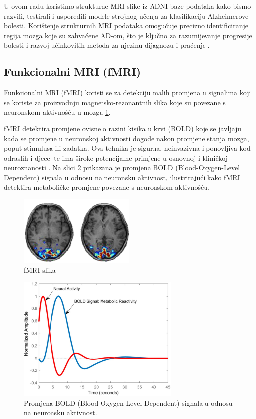 \documentclass[zavrsnirad]{fer}
\begin{document}
 U ovom radu koristimo strukturne MRI slike iz ADNI baze podataka kako bismo razvili, testirali i usporedili modele strojnog učenja za klasifikaciju Alzheimerove bolesti. Korištenje strukturnih MRI podataka omogućuje precizno identificiranje regija mozga koje su zahvaćene AD-om, što je ključno za razumijevanje progresije bolesti i razvoj učinkovitih metoda za njezinu dijagnozu i praćenje \cite{Gonuguntla2022}.


\subsection{Funkcionalni MRI (fMRI)}

Funkcionalni MRI (fMRI) koristi se za detekciju malih promjena u signalima koji se koriste za proizvodnju magnetsko-rezonantnih slika koje su povezane s neuronskom aktivnošću u mozgu \ref{fig:fMRI}. 

fMRI detektira promjene ovisne o razini kisika u krvi (BOLD) koje se javljaju kada se promjene u neuronskoj aktivnosti dogode nakon promjene stanja mozga, poput stimulusa ili zadatka. Ova tehnika je sigurna, neinvazivna i ponovljiva kod odraslih i djece, te ima široke potencijalne primjene u osnovnoj i kliničkoj neuroznanosti \cite{Gore2003}. Na slici \ref{fig:fMRI_BOLD} prikazana je promjena BOLD (Blood-Oxygen-Level Dependent) signala u odnosu na neuronsku aktivnost, ilustrirajući kako fMRI detektira metaboličke promjene povezane s neuronskom aktivnošću.


\begin{figure}[h]
	\centering
	\includegraphics[width=0.5\textwidth]{Figures/fMRI.png}
	\caption{fMRI slika \cite{ucsd2021}}
	\label{fig:fMRI}
\end{figure}

\begin{figure}[h]
	\centering
	\includegraphics[width=0.7\textwidth]{Figures/BOLD.jpg}
	\caption{Promjena BOLD (Blood-Oxygen-Level Dependent) signala u odnosu na neuronsku aktivnost.\cite{Schaper573006}}
	\label{fig:fMRI_BOLD}
\end{figure}
\end{document}
